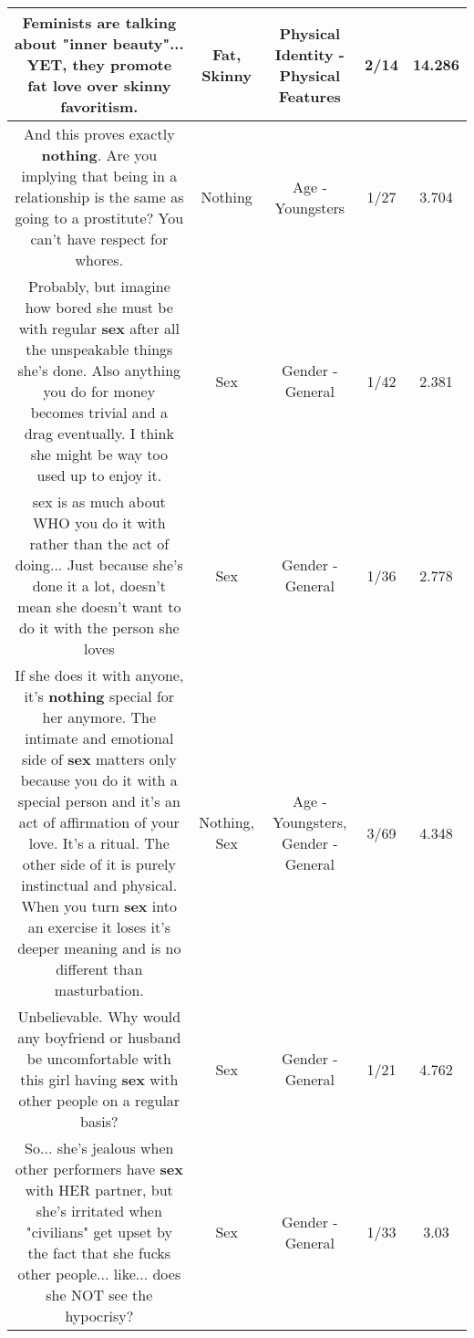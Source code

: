 \documentclass[11pt]{article}
\newlength\mylength
\begin{document}
\begin{center}
\begin{longtable}{|C{.65\mylength}|C{.30\mylength}|C{.12\mylength}|C{.12\mylength}|C{.12\mylength}|}
  \small Feminists are talking about "inner beauty"... YET, they promote \textbf{fat} love over \textbf{skinny} favoritism.\normalsize   & Fat, Skinny & Physical Identity - Physical Features & 2/14 & 14.286 \\  \hline
  \small And this proves exactly \textbf{nothing}. Are you implying that being in a relationship is the same as going to a prostitute? You can't have respect for whores.\normalsize   & Nothing & Age - Youngsters & 1/27 & 3.704 \\  \hline
  \small Probably, but imagine how bored she must be with regular \textbf{sex} after all the unspeakable things she's done. Also anything you do for money becomes trivial and a drag eventually. I think she might be way too used up  to enjoy it.\normalsize   & Sex & Gender - General & 1/42 & 2.381 \\  \hline
  \small sex is as much about WHO you do it with rather than the act of doing...  Just because she's done it a lot, doesn't mean she doesn't want to do it with the person she loves\normalsize   & Sex & Gender - General & 1/36 & 2.778 \\  \hline
  \small If she does it with anyone, it's \textbf{nothing} special for her anymore. The intimate and emotional side of \textbf{sex} matters only because you do it with a special person and it's an act of affirmation of your love. It's a ritual. The other side of it is purely instinctual and physical. When you turn \textbf{sex} into an exercise it loses it's deeper meaning and is no different than masturbation.\normalsize   & Nothing, Sex & Age - Youngsters, Gender - General & 3/69 & 4.348 \\  \hline
  \small Unbelievable. Why would any boyfriend or husband be uncomfortable with this girl having \textbf{sex} with other people on a regular basis?\normalsize   & Sex & Gender - General & 1/21 & 4.762 \\  \hline
  \small So... she's jealous when other performers have \textbf{sex} with HER partner, but she's irritated when "civilians" get upset by the fact that she fucks other people... like... does she NOT see the hypocrisy?\normalsize   & Sex & Gender - General & 1/33 & 3.03 \\  \hline

\end{longtable}
\end{center}
\end{document}
